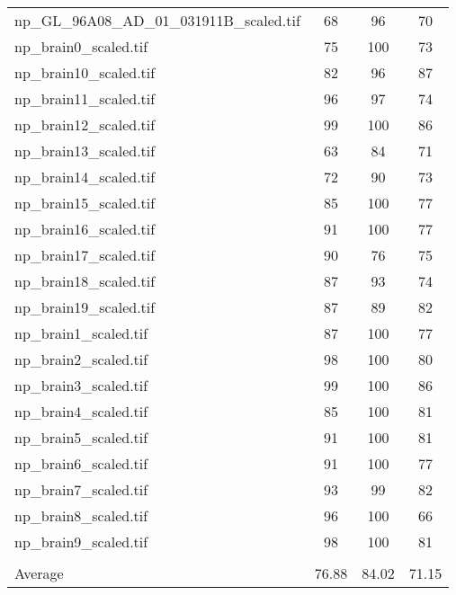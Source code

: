 \begin{tabular}{lccc}
 np\_GL\_96A08\_AD\_01\_031911B\_scaled.tif     & 68    & 96    & 70    \\
 np\_brain0\_scaled.tif                     & 75    & 100   & 73    \\
 np\_brain10\_scaled.tif                    & 82    & 96    & 87    \\
 np\_brain11\_scaled.tif                    & 96    & 97    & 74    \\
 np\_brain12\_scaled.tif                    & 99    & 100   & 86    \\
 np\_brain13\_scaled.tif                    & 63    & 84    & 71    \\
 np\_brain14\_scaled.tif                    & 72    & 90    & 73    \\
 np\_brain15\_scaled.tif                    & 85    & 100   & 77    \\
 np\_brain16\_scaled.tif                    & 91    & 100   & 77    \\
 np\_brain17\_scaled.tif                    & 90    & 76    & 75    \\
 np\_brain18\_scaled.tif                    & 87    & 93    & 74    \\
 np\_brain19\_scaled.tif                    & 87    & 89    & 82    \\
 np\_brain1\_scaled.tif                     & 87    & 100   & 77    \\
 np\_brain2\_scaled.tif                     & 98    & 100   & 80    \\
 np\_brain3\_scaled.tif                     & 99    & 100   & 86    \\
 np\_brain4\_scaled.tif                     & 85    & 100   & 81    \\
 np\_brain5\_scaled.tif                     & 91    & 100   & 81    \\
 np\_brain6\_scaled.tif                     & 91    & 100   & 77    \\
 np\_brain7\_scaled.tif                     & 93    & 99    & 82    \\
 np\_brain8\_scaled.tif                     & 96    & 100   & 66    \\
 np\_brain9\_scaled.tif                     & 98    & 100   & 81    \\
                                          &       &       &       \\
 Average                                  & 76.88 & 84.02 & 71.15 \\
\hline
\end{tabular}